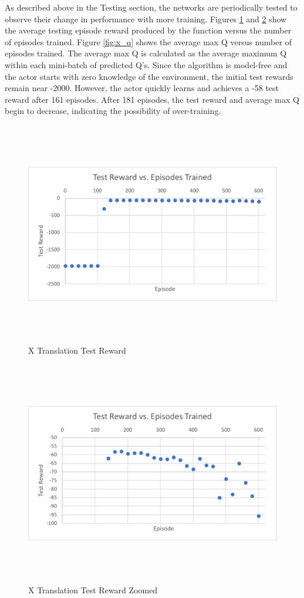 As described above in the Testing section, the networks are periodically tested to observe their change in performance with more training. Figures \ref{fig:x_r} and \ref{fig:x_rzoom} show the average testing episode reward produced by the \mbox{} function versus the number of episodes trained. Figure \ref{fig:x_q} shows the average max Q versus number of episodes trained. The average max Q is calculated as the average maximum Q within each mini-batch of predicted Q's. Since the algorithm is model-free and the actor starts with zero knowledge of the environment, the initial test rewards remain near -2000. However, the actor quickly learns and achieves a -58 test reward after 161 episodes. After 181 episodes, the test reward and average max Q begin to decrease, indicating the possibility of over-training. 
\begin{figure}[H]
	\centering
	\includegraphics[width=6in, height=3.85in, keepaspectratio]{figures/train_figs/x_r.pdf}
	\caption{X Translation Test Reward} \label{fig:x_r}
\end{figure}
\begin{figure}[H]
	\centering
	\includegraphics[width=6in, height=3.85in, keepaspectratio]{figures/train_figs/x_rzoom.pdf}
	\caption{X Translation Test Reward Zoomed} \label{fig:x_rzoom}
\end{figure}
